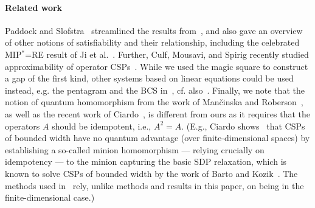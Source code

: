 \paragraph{Related work}
%
Paddock and Slofstra~\cite{Paddock23:arxiv} 
streamlined the results from~\cite{AKS19:jcss}, and also gave 
an overview of other notions of
satisfiability and their relationship, including the celebrated MIP$^*$=RE
result of Ji et al.~\cite{Ji20:arxiv,Ji22:cacm}.
%
Further, Culf, Mousavi, and Spirig recently studied approximability of operator
CSPs~\cite{Culf23:arxiv}.
%
While we used the magic square to construct a gap of the first kind, other
systems based on linear equations could be used instead, e.g. the pentagram and
the BCS in~\cite{Slofstra20:jams}, cf. also~\cite{Zhang24:arxiv}.
%
Finally, we note that the notion of quantum homomorphism from the work of Man\v{c}inska and
Roberson~\cite{Mancinska16:jctb}, as well as the recent work of
Ciardo~\cite{Ciardo24:lics},
is different from ours as it requires that the
operators $A$ should be idempotent, i.e., $A^2=A$.
(E.g., Ciardo shows~\cite{Ciardo24:lics} that CSPs of
bounded width have no quantum advantage (over finite-dimensional spaces) by establishing a so-called minion
homomorphism --- relying crucially on idempotency --- to the minion capturing the basic SDP relaxation, which is known
to solve CSPs of bounded width by the work of Barto and Kozik~\cite{Barto16:sicomp}. The methods used
in~\cite{Ciardo24:lics} rely, unlike methods and results in this paper, on being in the finite-dimensional case.)

